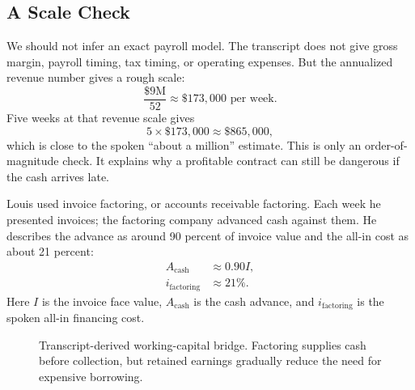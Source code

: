 \subsection{A Scale Check}

We should not infer an exact payroll model. The transcript does not give gross margin, payroll timing, tax timing, or operating expenses. But the annualized revenue number gives a rough scale:
\begin{equation}
\frac{\$9\text{M}}{52}
\approx
\$173{,}000\text{ per week}.
\end{equation}
Five weeks at that revenue scale gives
\begin{equation}
5 \times \$173{,}000 \approx \$865{,}000,
\end{equation}
which is close to the spoken ``about a million'' estimate. This is only an order-of-magnitude check. It explains why a profitable contract can still be dangerous if the cash arrives late.

Louis used invoice factoring, or accounts receivable factoring. Each week he presented invoices; the factoring company advanced cash against them. He describes the advance as around 90 percent of invoice value and the all-in cost as about 21 percent:
\begin{align}
A_{\mathrm{cash}} &\approx 0.90I,\\
i_{\mathrm{factoring}} &\approx 21\%.
\end{align}
Here \(I\) is the invoice face value, \(A_{\mathrm{cash}}\) is the cash advance, and \(i_{\mathrm{factoring}}\) is the spoken all-in financing cost.

\begin{figure}
\centering
{}
\caption{Transcript-derived working-capital bridge. Factoring supplies cash before collection, but retained earnings gradually reduce the need for expensive borrowing.}
\end{figure}

